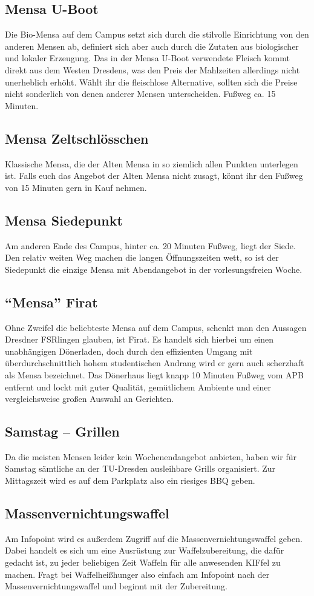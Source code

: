 \subsection*{Mensa U-Boot}
Die Bio-Mensa auf dem Campus setzt sich durch die stilvolle Einrichtung von den anderen Mensen ab, definiert sich aber auch durch die Zutaten aus biologischer und lokaler Erzeugung.
Das in der Mensa U-Boot verwendete Fleisch kommt direkt aus dem Westen Dresdens, was den Preis der Mahlzeiten allerdings nicht unerheblich erhöht.
Wählt ihr die fleischlose Alternative, sollten sich die Preise nicht sonderlich von denen anderer Mensen unterscheiden.
Fußweg ca. 15 Minuten.

\subsection*{Mensa Zeltschlösschen}
Klassische Mensa, die der Alten Mensa in so ziemlich allen Punkten unterlegen ist.
Falls euch das Angebot der Alten Mensa nicht zusagt, könnt ihr den Fußweg von 15 Minuten gern in Kauf nehmen.

\subsection*{Mensa Siedepunkt}
Am anderen Ende des Campus, hinter ca. 20 Minuten Fußweg, liegt der Siede.
Den relativ weiten Weg machen die langen Öffnungszeiten wett, so ist der Siedepunkt die einzige Mensa mit Abendangebot in der vorlesungsfreien Woche.

\subsection*{\enquote{Mensa} Firat}
Ohne Zweifel die beliebteste Mensa auf dem Campus, schenkt man den Aussagen Dresdner FSRlingen glauben, ist Firat.
Es handelt sich hierbei um einen unabhängigen Dönerladen, doch durch den effizienten Umgang mit überdurchschnittlich hohem studentischen Andrang wird er gern auch scherzhaft als Mensa bezeichnet.
Das Dönerhaus liegt knapp 10 Minuten Fußweg vom APB entfernt und lockt mit guter Qualität, gemütlichem Ambiente und einer vergleichsweise großen Auswahl an Gerichten.

\subsection*{Samstag -- Grillen}
Da die meisten Mensen leider kein Wochenendangebot anbieten, haben wir für Samstag sämtliche an der TU-Dresden ausleihbare Grills organisiert.
Zur Mittagszeit wird es auf dem Parkplatz also ein riesiges BBQ geben.


\subsection*{Massenvernichtungswaffel}
Am Infopoint wird es außerdem Zugriff auf die Massenvernichtungswaffel geben.
Dabei handelt es sich um eine Ausrüstung zur Waffelzubereitung, die dafür gedacht ist, zu jeder beliebigen Zeit Waffeln für alle anwesenden KIFfel zu machen.
Fragt bei Waffelheißhunger also einfach am Infopoint nach der Massenvernichtungswaffel und beginnt mit der Zubereitung.
